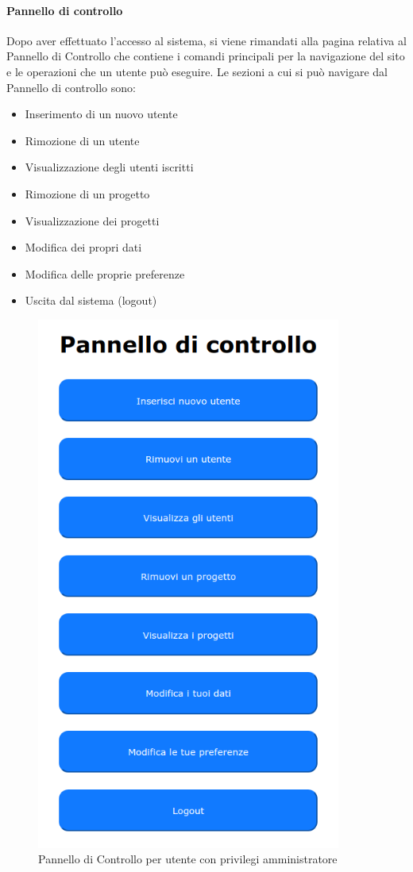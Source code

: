 \paragraph{Pannello di controllo}
Dopo aver effettuato l'accesso al sistema, si viene rimandati alla pagina relativa al Pannello di Controllo che contiene i comandi principali per la navigazione del sito e le operazioni che un utente può eseguire.
Le sezioni a cui si può navigare dal Pannello di controllo sono:
\begin{itemize}
    \item Inserimento di un nuovo utente
    \item Rimozione di un utente
    \item Visualizzazione degli utenti iscritti
    \item Rimozione di un progetto
    \item Visualizzazione dei progetti
    \item Modifica dei propri dati
    \item Modifica delle proprie preferenze
	\item Uscita dal sistema (logout)
\end{itemize}
\begin{figure}[H]
    \centering
    \includegraphics[width=10cm]{img/admin_panel_1.png}
    \caption{Pannello di Controllo per utente con privilegi amministratore}
\end{figure}

